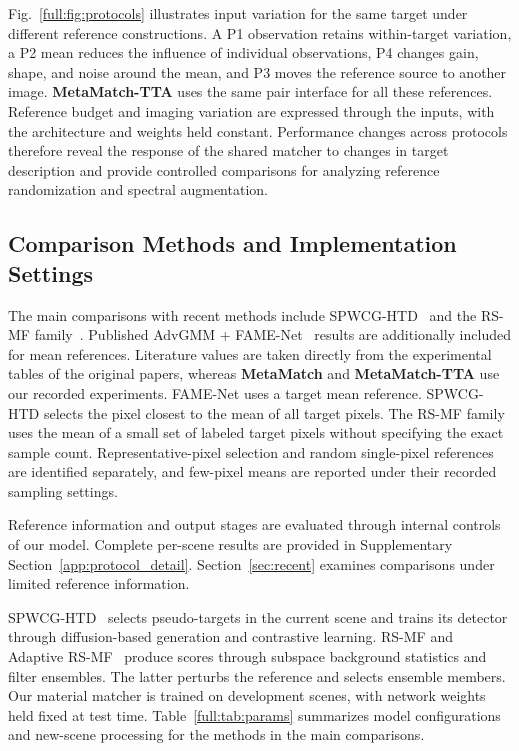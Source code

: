 \documentclass[a4paper,11pt]{article}
\newcommand{\method}{\textbf{MetaMatch-TTA}}
\newcommand{\matcher}{\textbf{MetaMatch}}
\begin{document}
Fig.~\ref{full:fig:protocols} illustrates input variation for the same target under different reference constructions. A P1 observation retains within-target variation, a P2 mean reduces the influence of individual observations, P4 changes gain, shape, and noise around the mean, and P3 moves the reference source to another image. \method{} uses the same pair interface for all these references. Reference budget and imaging variation are expressed through the inputs, with the architecture and weights held constant. Performance changes across protocols therefore reveal the response of the shared matcher to changes in target description and provide controlled comparisons for analyzing reference randomization and spectral augmentation.

\subsection{Comparison Methods and Implementation Settings}
The main comparisons with recent methods include SPWCG-HTD~\cite{spwcg2026} and the RS-MF family~\cite{rsmf2026}. Published AdvGMM + FAME-Net~\cite{fame} results are additionally included for mean references. Literature values are taken directly from the experimental tables of the original papers, whereas \matcher{} and \method{} use our recorded experiments. FAME-Net uses a target mean reference. SPWCG-HTD selects the pixel closest to the mean of all target pixels. The RS-MF family uses the mean of a small set of labeled target pixels without specifying the exact sample count. Representative-pixel selection and random single-pixel references are identified separately, and few-pixel means are reported under their recorded sampling settings.

Reference information and output stages are evaluated through internal controls of our model. Complete per-scene results are provided in Supplementary Section~\ref{app:protocol_detail}. Section~\ref{sec:recent} examines comparisons under limited reference information.

SPWCG-HTD~\cite{spwcg2026} selects pseudo-targets in the current scene and trains its detector through diffusion-based generation and contrastive learning. RS-MF and Adaptive RS-MF~\cite{rsmf2026} produce scores through subspace background statistics and filter ensembles. The latter perturbs the reference and selects ensemble members. Our material matcher is trained on development scenes, with network weights held fixed at test time. Table~\ref{full:tab:params} summarizes model configurations and new-scene processing for the methods in the main comparisons.
\end{document}
